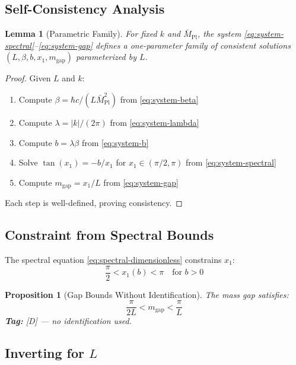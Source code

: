 \documentclass[11pt,a4paper]{article}
\newtheorem{lemma}[theorem]{Lemma}
\newtheorem{proposition}[theorem]{Proposition}
\begin{document}
\subsection{Self-Consistency Analysis}

\begin{lemma}[Parametric Family]
\label{lem:parametric}
For fixed $k$ and $\bar{M}_{\text{Pl}}$, the system \eqref{eq:system-spectral}--\eqref{eq:system-gap}
defines a one-parameter family of consistent solutions $(L, \beta, b, x_1, m_{\text{gap}})$
parameterized by $L$.
\end{lemma}

\begin{proof}
Given $L$ and $k$:
\begin{enumerate}
  \item Compute $\beta = \hbar c / (L \bar{M}_{\text{Pl}}^2)$ from \eqref{eq:system-beta}
  \item Compute $\lambda = |k|/(2\pi)$ from \eqref{eq:system-lambda}
  \item Compute $b = \lambda \beta$ from \eqref{eq:system-b}
  \item Solve $\tan(x_1) = -b/x_1$ for $x_1 \in (\pi/2, \pi)$ from \eqref{eq:system-spectral}
  \item Compute $m_{\text{gap}} = x_1/L$ from \eqref{eq:system-gap}
\end{enumerate}
Each step is well-defined, proving consistency.
\end{proof}

\subsection{Constraint from Spectral Bounds}

The spectral equation \eqref{eq:spectral-dimensionless} constrains $x_1$:
\begin{equation}
  \frac{\pi}{2} < x_1(b) < \pi \quad \text{for } b > 0
  \label{eq:x1-bounds}
\end{equation}

\begin{proposition}[Gap Bounds Without Identification]
\label{prop:gap-bounds}
The mass gap satisfies:
\begin{equation}
  \boxed{\frac{\pi}{2L} < m_{\text{gap}} < \frac{\pi}{L}}
  \label{eq:gap-bounds}
\end{equation}
\textbf{Tag:} [D] — no identification used.
\end{proposition}

\subsection{Inverting for $L$}
\end{document}
